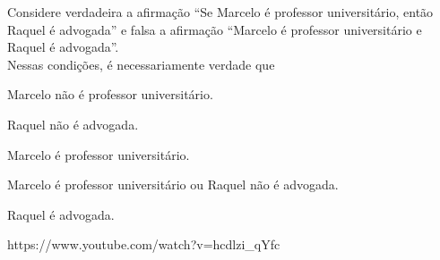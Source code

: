 \questao{}
{Considere verdadeira a afirmação “Se Marcelo é professor universitário, então Raquel é advogada” e falsa a afirmação “Marcelo é professor universitário e Raquel é advogada”.\\
Nessas condições, é necessariamente verdade que}
{
\item Marcelo não é professor universitário.
\item Raquel não é advogada.
\item Marcelo é professor universitário.
\item Marcelo é professor universitário ou Raquel não é advogada.
\item Raquel é advogada.}
{https://www.youtube.com/watch?v=hcdlzi_qYfc}




